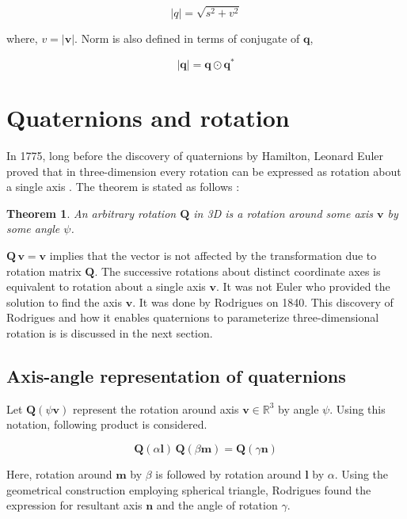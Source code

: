 \documentclass[12pt]{article}
\newtheorem{theorem}{Theorem}
\begin{document}
\begin{equation}
    |q| = \sqrt{s^{2} + v^{2}}
\end{equation}

where, $v = |\bm{v}|$. Norm is also defined in terms of conjugate of $\bm{q}$,

\begin{equation}
    |\bm{q}| = \bm{q} \odot \bm{q}^{*}
\end{equation} 

\section{Quaternions and rotation}
In 1775, long before the discovery of quaternions by Hamilton, Leonard Euler proved that in three-dimension every rotation can be expressed as rotation about a single axis \cite{altmann1989}. The theorem is stated as follows \cite{kenechi2020}:

\begin{theorem}
    An arbitrary rotation $\bm{Q}$ in 3D is a rotation around some axis $\bm{v}$ by some angle $\psi$. 
\end{theorem}

$\bm{Q} \, \bm{v} = \bm{v}$ implies that the vector is not affected by the transformation due to rotation matrix $\bm{Q}$. The successive rotations about distinct coordinate axes is equivalent to rotation about a single axis $\bm{v}$. It was not Euler who provided the solution to find the axis $\bm{v}$. It was done by Rodrigues on 1840. This discovery of Rodrigues and how it enables quaternions to parameterize three-dimensional rotation is is discussed in the next section.  

\subsection{Axis-angle representation of quaternions}
Let $\bm{Q}(\psi \bm{v})$ represent the rotation around axis $\bm{v} \in \mathbb{R}^{3} $ by angle $\psi$. Using this notation, following product is considered.

\begin{equation}
    \bm{Q}(\alpha \bm{l}) \, \bm{Q}(\beta \bm{m}) = \bm{Q}(\gamma \bm{n})
    \label{eqn_rodrigues_rot}
\end{equation}

Here, rotation around $\bm{m}$ by $\beta$ is followed by rotation around $\bm{l}$ by $\alpha$. Using the geometrical construction employing spherical triangle, Rodrigues found the expression for resultant axis $\bm{n}$ and the angle of rotation $\gamma$.  
\end{document}

